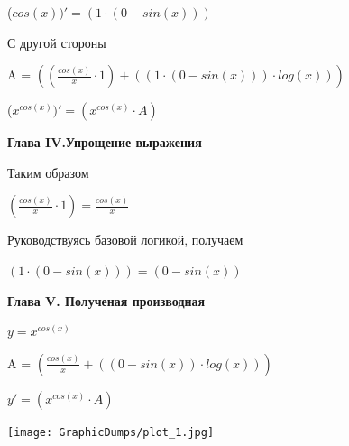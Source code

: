 \documentclass[12pt,a4paper,fleqn]{article}
\begin{document}
\begin{center}
 ($cos(x))'
  = (1 \cdot (0 - sin(x)))$\end{center}
С другой стороны

\begin{center}
A = $((\frac{cos(x)}{x} \cdot 1) + ((1 \cdot (0 - sin(x))) \cdot log(x)))$\end{center}
\begin{center}
 ($x^{cos(x)})'
  = (x^{cos(x)} \cdot A)$\end{center}
\newpage \textbf{\LARGE Глава IV.Упрощение выражения}

Таким образом

\begin{center}
$(\frac{cos(x)}{x} \cdot 1) = \frac{cos(x)}{x}$\end{center}
Руководствуясь базовой логикой, получаем

\begin{center}
$(1 \cdot (0 - sin(x))) = (0 - sin(x))$\end{center}
\newpage \textbf{\LARGE Глава V. Полученая производная}

$y = $$x^{cos(x)}$

\begin{center}
A = $(\frac{cos(x)}{x} + ((0 - sin(x)) \cdot log(x)))$\end{center}
$y' = $$(x^{cos(x)} \cdot A)$

\texttt{[image: GraphicDumps/plot\_1.jpg]}
\end{document}
